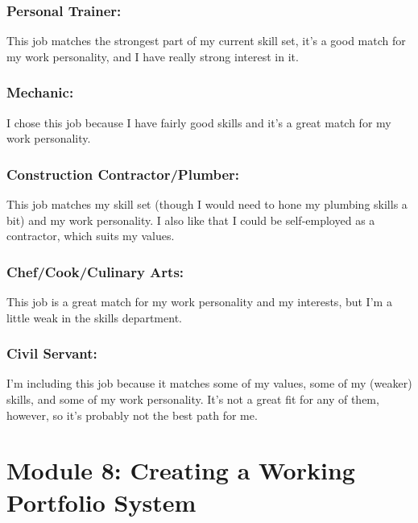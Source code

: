 \subsubsection*{Personal Trainer:} This job matches the strongest part of my current skill set, it's a good match for my work personality, and I have really strong interest in it.

\subsubsection*{Mechanic:} I chose this job because I have fairly good skills and it's a great match for my work personality.

\subsubsection*{Construction Contractor/Plumber:} This job matches my skill set (though I would need to hone my plumbing skills a bit) and my work personality. I also like that I could be self-employed as a contractor, which suits my values.

\subsubsection*{Chef/Cook/Culinary Arts:} This job is a great match for my work personality and my interests, but I'm a little weak in the skills department.

\subsubsection*{Civil Servant:} I'm including this job because it matches some of my values, some of my (weaker) skills, and some of my work personality. It's not a great fit for any of them, however, so it's probably not the best path for me.

\pagebreak \section*{Module 8:	Creating a Working Portfolio System}
\noindent\makebox[\textwidth]{\rule{\linewidth}{0.4pt}} 
\localtableofcontents
\noindent\makebox[\textwidth]{\rule{\linewidth}{0.4pt}}



